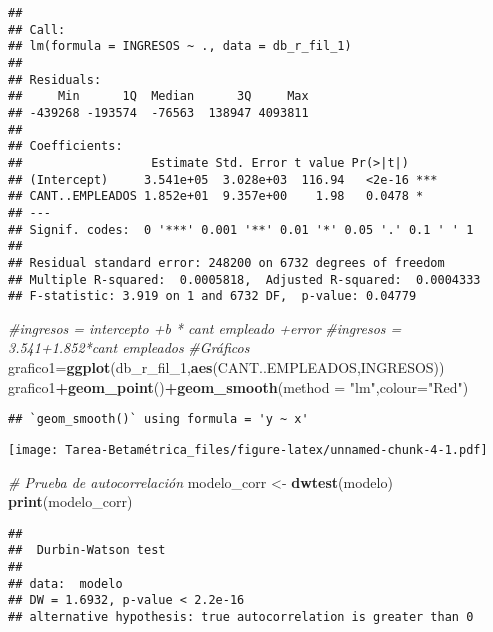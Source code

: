 \documentclass[
]{article}
\newenvironment{Shaded}{\begin{snugshade}}{\end{snugshade}}
\newcommand{\AttributeTok}[1]{\textcolor[rgb]{0.13,0.29,0.53}{#1}}
\newcommand{\CommentTok}[1]{\textcolor[rgb]{0.56,0.35,0.01}{\textit{#1}}}
\newcommand{\FunctionTok}[1]{\textcolor[rgb]{0.13,0.29,0.53}{\textbf{#1}}}
\newcommand{\NormalTok}[1]{#1}
\newcommand{\OtherTok}[1]{\textcolor[rgb]{0.56,0.35,0.01}{#1}}
\newcommand{\SpecialCharTok}[1]{\textcolor[rgb]{0.81,0.36,0.00}{\textbf{#1}}}
\newcommand{\StringTok}[1]{\textcolor[rgb]{0.31,0.60,0.02}{#1}}
\begin{document}
\begin{verbatim}
## 
## Call:
## lm(formula = INGRESOS ~ ., data = db_r_fil_1)
## 
## Residuals:
##     Min      1Q  Median      3Q     Max 
## -439268 -193574  -76563  138947 4093811 
## 
## Coefficients:
##                  Estimate Std. Error t value Pr(>|t|)    
## (Intercept)     3.541e+05  3.028e+03  116.94   <2e-16 ***
## CANT..EMPLEADOS 1.852e+01  9.357e+00    1.98   0.0478 *  
## ---
## Signif. codes:  0 '***' 0.001 '**' 0.01 '*' 0.05 '.' 0.1 ' ' 1
## 
## Residual standard error: 248200 on 6732 degrees of freedom
## Multiple R-squared:  0.0005818,  Adjusted R-squared:  0.0004333 
## F-statistic: 3.919 on 1 and 6732 DF,  p-value: 0.04779
\end{verbatim}

\begin{Shaded}
\begin{Highlighting}[]
\CommentTok{\#ingresos = intercepto +b * cant empleado +error}
\CommentTok{\#ingresos = 3.541+1.852*cant empleados}
\CommentTok{\#Gráficos}
\NormalTok{grafico1}\OtherTok{=}\FunctionTok{ggplot}\NormalTok{(db\_r\_fil\_1,}\FunctionTok{aes}\NormalTok{(CANT..EMPLEADOS,INGRESOS))}
\NormalTok{grafico1}\SpecialCharTok{+}\FunctionTok{geom\_point}\NormalTok{()}\SpecialCharTok{+}\FunctionTok{geom\_smooth}\NormalTok{(}\AttributeTok{method =} \StringTok{"lm"}\NormalTok{,}\AttributeTok{colour=}\StringTok{"Red"}\NormalTok{)}
\end{Highlighting}
\end{Shaded}

\begin{verbatim}
## `geom_smooth()` using formula = 'y ~ x'
\end{verbatim}

\texttt{[image: Tarea-Betamétrica\_files/figure-latex/unnamed-chunk-4-1.pdf]}

\begin{Shaded}
\begin{Highlighting}[]
\CommentTok{\# Prueba de autocorrelación}
\NormalTok{modelo\_corr }\OtherTok{\textless{}{-}} \FunctionTok{dwtest}\NormalTok{(modelo) }
\FunctionTok{print}\NormalTok{(modelo\_corr)}
\end{Highlighting}
\end{Shaded}

\begin{verbatim}
## 
##  Durbin-Watson test
## 
## data:  modelo
## DW = 1.6932, p-value < 2.2e-16
## alternative hypothesis: true autocorrelation is greater than 0
\end{verbatim}
\end{document}

